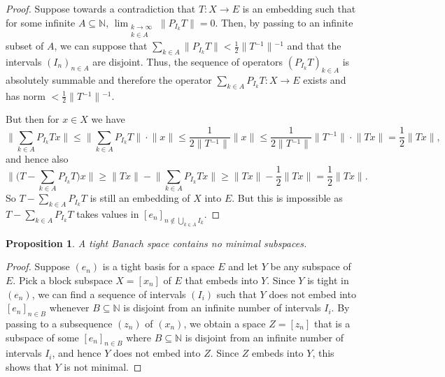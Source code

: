 \documentclass[10pt]{amsart}
\numberwithin{equation}{section}
\newtheorem{prop} [thm] {Proposition}
\begin{document}
\begin{proof}
Suppose towards a contradiction that $T\colon X{\rightarrow} E$ is an embedding such
that for some infinite $A\subseteq {\mathbb N}$, $\lim_{\substack{k{\rightarrow} \infty\\k\in
A}}{\lVert{P_{I_k}T}\rVert}=0$. Then, by passing to an infinite subset of $A$, we can
suppose that $\sum_{k\in A}{\lVert{P_{I_k}T}\rVert}<\frac 12{\lVert{T{^{-1}}}\rVert}{^{-1}}$ and that
the intervals $(I_n)_{n\in A}$ are disjoint. Thus, the sequence of operators
$(P_{I_k}T)_{k\in A}$ is absolutely summable and therefore the operator
$\sum_{k\in A}P_{I_k}T\colon X{\rightarrow} E$ exists and has norm
$<\frac12{\lVert{T{^{-1}}}\rVert}{^{-1}}$.

But then for $x\in X$ we have
\begin{displaymath}
{\lVert{\sum_{k\in A}P_{I_k}Tx}\rVert}{\ensuremath{\leqslant}} {\lVert{\sum_{k\in A}P_{I_k}T}\rVert}\cdot{\lVert{x}\rVert}{\ensuremath{\leqslant}} \frac
1{2{\lVert{T{^{-1}}}\rVert}}{\lVert{x}\rVert}{\ensuremath{\leqslant}} \frac 1{2{\lVert{T{^{-1}}}\rVert}}{\lVert{T{^{-1}}}\rVert}\cdot{\lVert{Tx}\rVert}=\frac12{\lVert{Tx}\rVert},
\end{displaymath}
and hence also
\begin{displaymath}
{\lVert{\big(T-\sum_{k\in A}P_{I_k}T\big)x}\rVert}{\ensuremath{\geqslant}} {\lVert{Tx}\rVert}-{\lVert{\sum_{k\in A}P_{I_k}Tx}\rVert}{\ensuremath{\geqslant}} {\lVert{Tx}\rVert}-\frac 12{\lVert{Tx}\rVert}=\frac12{\lVert{Tx}\rVert}.
\end{displaymath}
So $T-\sum_{k\in A}P_{I_k}T$ is still an embedding of $X$ into $E$. But this is
impossible as $T-\sum_{k\in A}P_{I_k}T$ takes values in
$[e_n]_{n\notin\bigcup_{k\in A}I_k}$. \end{proof}

\begin{prop}
A tight Banach space contains no minimal subspaces.
\end{prop}

\begin{proof}
Suppose $(e_n)$ is a tight basis for a space $E$ and let $Y$ be any subspace of
$E$. Pick a block subspace $X=[x_n]$ of $E$ that embeds into $Y$. Since $Y$ is
tight in $(e_n)$, we can find a sequence of intervals $(I_i)$ such that $Y$
does not embed into $[e_n]_{n\in B}$ whenever $B\subseteq {\mathbb N}$ is disjoint from
an infinite number of intervals $I_i$. By passing to a subsequence $(z_n)$ of
$(x_n)$, we obtain a space $Z=[z_n]$ that is a subspace of some $[e_n]_{n\in
B}$ where $B\subseteq {\mathbb N}$ is disjoint from an infinite number of intervals
$I_i$, and hence $Y$ does not embed into $Z$. Since $Z$ embeds into $Y$, this
shows that $Y$ is not minimal.
\end{proof}
\end{document}
